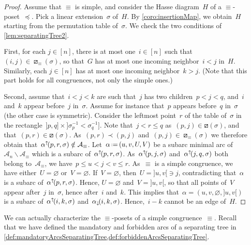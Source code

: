 \documentclass{amsart}
\theoremstyle{definition}
\newcommand{\ssm}{\smallsetminus} %
\newcommand{\eqdef}{\mbox{\,\raisebox{0.2ex}{\scriptsize\ensuremath{\mathrm:}}\ensuremath{=}\,}} %
\newcommand{\arcs}{{\mathcal{A}}} %
\newcommand{\arcDown}{\smash{\alpha_{\downarrow\!}}} %
\newcommand{\arcUp}{\smash{\alpha^{\uparrow\!}}} %
\begin{document}
\begin{proof}
Assume that $\equiv$ is simple, and consider the Hasse diagram~$H$ of a $\equiv$-poset~$\preccurlyeq$.
Pick a linear extension~$\sigma$ of~$H$.
By \cref{coro:insertionMap}, we obtain~$H$ starting from the permutation table of~$\sigma$.
We check the two conditions of \cref{lem:separatingTree2}.

First, for each $j \in [n]$, there is at most one~$i \in [n]$ such that~$(i,j) \in \boxslash_\equiv(\sigma)$, so that~$G$ has at most one incoming neighbor~$i < j$ in~$H$.
Similarly, each $j \in [n]$ has at most one incoming neighbor~$k > j$.
(Note that this part holds for all congruences, not only the simple ones.)

Second, assume that~$i < j < k$ are such that~$j$ has two children~$p < j < q$, and~$i$ and~$k$ appear before~$j$ in~$\sigma$.
Assume for instance that~$p$ appears before~$q$ in~$\sigma$ (the other case is symmetric).
Consider the leftmost point~$r$ of the table of~$\sigma$ in the rectangle~${]p, q]} \times {]\sigma^{-1}_p < \sigma^{-1}_q]}$.
Note that~${j < r \le q}$ as~$(p,j) \in \boxslash(\sigma)$, and that~$(p,r) \in \boxslash(\sigma)$.
As~$(p, r) \prec (p, j)$ and~$(p, j) \in \boxslash_\equiv(\sigma)$ we therefore obtain that~$\arcUp(p, r, \sigma) \notin \arcs_\equiv$.
Let~$\alpha \eqdef (u, v, U, V)$ be a subarc minimal arc of~$\arcs_n \ssm \arcs_\equiv$ which is a subarc of~$\arcUp(p, r, \sigma)$.
As~$\arcUp(p, j, \sigma)$ and~$\arcUp(j, q, \sigma)$ both belong to~$\arcs_\equiv$, we have~$p \le u < j < v \le r$.
As~$\equiv$ is a simple congruence, we have either~$U = \varnothing$ or~$V = \varnothing$.
If~$V = \varnothing$, then~$U = {]u,v[} \ni j$, contradicting that~$\alpha$ is a subarc of~$\arcUp(p, r, \sigma)$.
Hence, $U = \varnothing$ and~$V = {]u,v[}$, so that all points of~$V$ appear after~$j$ in~$\sigma$, hence after~$i$ and~$k$.
This implies that~$\alpha = (u, v, \varnothing, {]u,v[})$ is a subarc of~$\arcUp(i, k, \sigma)$ and~$\arcDown(i, k, \sigma)$.
Hence,~$i-k$ cannot be an edge of~$H$.
\end{proof}

We can actually characterize the $\equiv$-posets of a simple congruence~$\equiv$.
Recall that we have defined the mandatory and forbidden arcs of a separating tree in \cref{def:mandatoryArcsSeparatingTree,def:forbiddenArcsSeparatingTree}.
\end{document}

